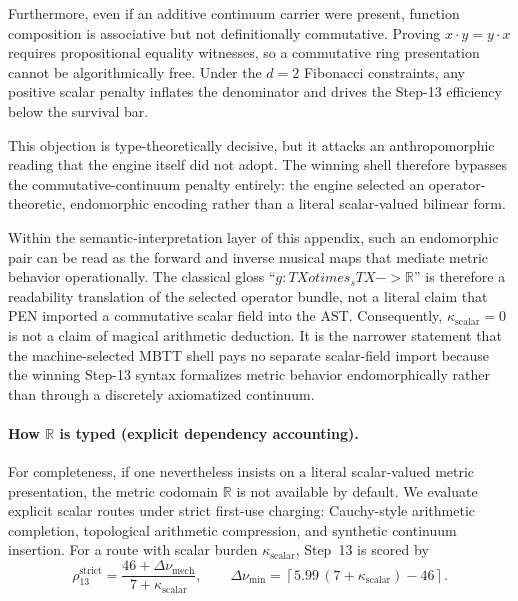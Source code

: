 \documentclass[11pt,a4paper]{article}
\def\to{->}%
\def\otimes{otimes}%
\theoremstyle{plain}
\theoremstyle{definition}
\theoremstyle{remark}
\newcommand{\R}{\mathbb{R}}
\begin{document}
Furthermore, even if an additive continuum carrier were present, function composition is associative but not definitionally commutative.
Proving $x \cdot y = y \cdot x$ requires propositional equality witnesses, so a commutative ring presentation cannot be algorithmically free.
Under the $d=2$ Fibonacci constraints, any positive scalar penalty inflates the denominator and drives the Step-13 efficiency below the survival bar.

This objection is type-theoretically decisive, but it attacks an anthropomorphic reading that the engine itself did not adopt.
The winning shell therefore bypasses the commutative-continuum penalty entirely: the engine selected an operator-theoretic, endomorphic encoding rather than a literal scalar-valued bilinear form.

Within the semantic-interpretation layer of this appendix, such an endomorphic pair can be read as the forward and inverse musical maps that mediate metric behavior operationally.
The classical gloss ``$g : TX \otimes_s TX \to \R$'' is therefore a readability translation of the selected operator bundle, not a literal claim that PEN imported a commutative scalar field into the AST.
Consequently, $\kappa_{\mathrm{scalar}} = 0$ is not a claim of magical arithmetic deduction.
It is the narrower statement that the machine-selected MBTT shell pays no separate scalar-field import because the winning Step-13 syntax formalizes metric behavior endomorphically rather than through a discretely axiomatized continuum.

\paragraph{How $\R$ is typed (explicit dependency accounting).}
For completeness, if one nevertheless insists on a literal scalar-valued metric presentation, the metric codomain $\R$ is not available by default.
We evaluate explicit scalar routes under strict first-use charging: Cauchy-style arithmetic completion, topological arithmetic compression, and synthetic continuum insertion.
For a route with scalar burden $\kappa_{\mathrm{scalar}}$, Step~13 is scored by
\[
  \rho_{13}^{\mathrm{strict}} = \frac{46 + \Delta \nu_{\mathrm{mech}}}{7 + \kappa_{\mathrm{scalar}}},
  \qquad
  \Delta \nu_{\min} = \left\lceil 5.99\,(7+\kappa_{\mathrm{scalar}})-46\right\rceil.
\]
\end{document}

